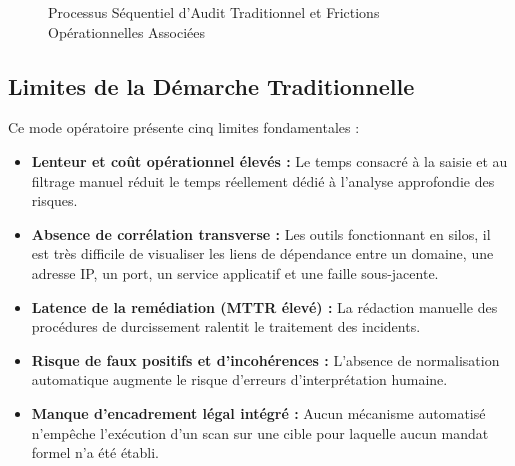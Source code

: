 \begin{figure}[H]
\centering
{}
\caption{Processus S\'equentiel d'Audit Traditionnel et Frictions Op\'erationnelles Associ\'ees}
\label{fig:processus_audit_traditionnel}
\end{figure}

\subsection{Limites de la D\'emarche Traditionnelle}
\par Ce mode op\'eratoire pr\'esente cinq limites fondamentales :
\begin{itemize}
    \item \textbf{Lenteur et co\^ut op\'erationnel \'elev\'es :} Le temps consacr\'e \`a la saisie et au filtrage manuel r\'eduit le temps r\'eellement d\'edi\'e \`a l'analyse approfondie des risques.
    \item \textbf{Absence de corr\'elation transverse :} Les outils fonctionnant en silos, il est tr\`es difficile de visualiser les liens de d\'ependance entre un domaine, une adresse IP, un port, un service applicatif et une faille sous-jacente.
    \item \textbf{Latence de la rem\'ediation (MTTR \'elev\'e) :} La r\'edaction manuelle des proc\'edures de durcissement ralentit le traitement des incidents.
    \item \textbf{Risque de faux positifs et d'incoh\'erences :} L'absence de normalisation automatique augmente le risque d'erreurs d'interpr\'etation humaine.
    \item \textbf{Manque d'encadrement l\'egal int\'egr\'e :} Aucun m\'ecanisme automatis\'e n'emp\^eche l'ex\'ecution d'un scan sur une cible pour laquelle aucun mandat formel n'a \'et\'e \'etabli.
\end{itemize}

